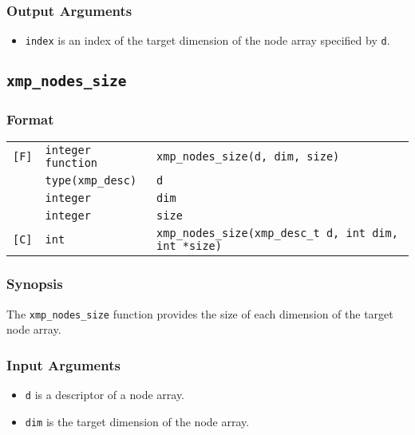 \subsubsection*{Output Arguments}

\begin{itemize}
 \item {\tt index} is an index of the target dimension of the node array
       specified by {\tt d}.
\end{itemize}


\subsection{\tt xmp\_nodes\_size}

\subsubsection*{Format}

\begin{tabular}{lll}

\verb![F]!& {\tt integer function}& {\tt xmp\_nodes\_size(d, dim, size)}\\
          & {\tt type(xmp\_desc)} & {\tt d}\\
          & {\tt integer} & {\tt dim}\\
          & {\tt integer} & {\tt size}\\

\verb![C]!&  {\tt int}& {\tt xmp\_nodes\_size(xmp\_desc\_t d, int dim, int *size)}\\

\end{tabular}

\subsubsection*{Synopsis}

The {\tt xmp\_nodes\_size} function provides the size of each dimension
of the target node array.

\subsubsection*{Input Arguments}

\begin{itemize}
 \item {\tt d} is a descriptor of a node array.
 \item {\tt dim} is the target dimension of the node array.
\end{itemize}

